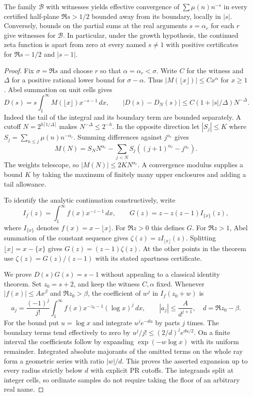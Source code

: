 \begin{theorem}\label{thm:growth}
The family $\mathcal B$ with witnesses yields effective convergence of
$\sum\mu(n)n^{-s}$ in every certified half-plane $\Re s>1/2$ bounded away from its boundary, locally in $|s|$. Conversely, bounds on the partial sums at the real arguments $s=\alpha_r$ for each $r$ give witnesses for $\mathcal B$. In particular, under the growth hypothesis, the continued zeta function is apart from zero at every named $s\ne1$ with positive certificates for $\Re s-1/2$ and $|s-1|$.
\end{theorem}
\begin{proof}
Fix $\sigma=\Re s$ and choose $r$ so that $\alpha=\alpha_r<\sigma$. Write $C$ for the witness and $\Delta$ for a positive rational lower bound for $\sigma-\alpha$. Thus $|M(\lfloor x\rfloor)|\le Cx^\alpha$ for $x\ge1$. Abel summation on unit cells gives
\[
 D(s)=s\int_1^\infty M(\lfloor x\rfloor)x^{-s-1}\,dx,\qquad
 |D(s)-D_N(s)|\le C(1+|s|/\Delta)N^{-\Delta}.
\]
Indeed the tail of the integral and its boundary term are bounded separately. A cutoff $N=2^{h\lceil1/\Delta\rceil}$ makes $N^{-\Delta}\le2^{-h}$. In the opposite direction let $|S_j|\le K$ where $S_j=\sum_{n\le j}\mu(n)n^{-\alpha_r}$. Summing differences against $j^{\alpha_r}$ gives
\[
 M(N)=S_N N^{\alpha_r}-\sum_{j<N} S_j((j+1)^{\alpha_r}-j^{\alpha_r}).
\]
The weights telescope, so $|M(N)|\le 2K N^{\alpha_r}$. A convergence modulus supplies a bound $K$ by taking the maximum of finitely many upper enclosures and adding a tail allowance.

To identify the analytic continuation constructively, write
\[
 I_f(z)=\int_1^\infty f(x)x^{-z-1}\,dx,\qquad
 G(z)=z-z(z-1)I_{\{x\}}(z),
\]
where $I_{\{x\}}$ denotes $f(x)=x-\lfloor x\rfloor$. For $\Re z>0$ this defines $G$. For $\Re z>1$, Abel summation of the constant sequence gives $\zeta(z)=zI_{\lfloor x\rfloor}(z)$. Splitting $\lfloor x\rfloor=x-\{x\}$ gives $G(z)=(z-1)\zeta(z)$. At the other points in the theorem use $\zeta(z)=G(z)/(z-1)$ with its stated apartness certificate.

We prove $D(s)G(s)=s-1$ without appealing to a classical identity theorem. Set $z_0=s+2$, and keep the witness $C,\alpha$ fixed. Whenever $|f(x)|\le A x^\beta$ and $\Re z_0>\beta$, the coefficient of $w^j$ in $I_f(z_0+w)$ is
\[
 a_j=\frac{(-1)^j}{j!}\int_1^\infty f(x)x^{-z_0-1}(\log x)^j\,dx,
 \qquad |a_j|\le \frac{A}{d^{j+1}},\quad d=\Re z_0-\beta.
\]
For the bound put $u=\log x$ and integrate $u^j e^{-du}$ by parts $j$ times. The boundary terms tend effectively to zero by $u^j/j!\le(2/d)^j e^{du/2}$. On a finite interval the coefficients follow by expanding $\exp(-w\log x)$ with its uniform remainder. Integrated absolute majorants of the omitted terms on the whole ray form a geometric series with ratio $|w|/d$. This proves the asserted expansion up to every radius strictly below $d$ with explicit PR cutoffs. The integrands split at integer cells, so ordinate samples do not require taking the floor of an arbitrary real name.


\end{proof}
